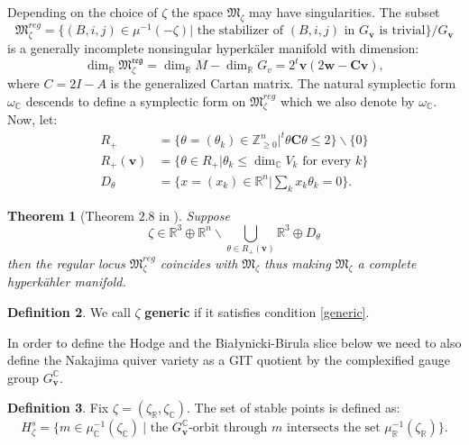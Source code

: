 \documentclass[12pt,oneside,reqno]{amsart}
\newtheorem{theorem}{Theorem}
\theoremstyle{definition}
\newtheorem{definition}[theorem]{Definition}
\numberwithin{equation}{section}
\numberwithin{theorem}{section}
\newcommand{\Z}{\mathbb{Z}}
\newcommand{\R}{\mathbb{R}}
\newcommand{\C}{\mathbb{C}}
\renewcommand{\dim}{\operatorname{dim}}
\begin{document}
Depending on the choice of $\zeta$ the space $\mathfrak{M}_{\zeta}$ may have singularities. The subset
%
\begin{equation}
\mathfrak{M}_{\zeta}^{reg}=\{(B,i,j) \in \mu^{-1}(-\zeta)|\text{ the stabilizer of }(B,i,j) \text{ in } G_{\mathbf{v}} \text{ is trivial}\}/G_{\mathbf{v}}
\end{equation}
%
is a generally incomplete nonsingular hyperk\"aler manifold with dimension: 
\begin{equation*}
\dim_\R \mathfrak{M_\zeta ^{reg}}=\dim_\R M-\dim_\R G_v=2^t \mathbf{v}(2\mathbf{w}-\mathbf{Cv}), 
\end{equation*}
%
where $C=2I-A$ is the generalized Cartan matrix. The natural symplectic form $\omega_{\C}$ descends to define a symplectic form on $\mathfrak{M}_\zeta ^{reg}$ which we also denote by $\omega_\C$. Now, let: 
%
\begin{equation*}
    \begin{split}
        R_+ &=\{\theta =(\theta_k) \in \Z_{\ge 0}^n | ^t \theta\mathbf{C}\theta \le2\}\backslash \{0\} \\
        R_+(\mathbf{v})&= \{\theta \in R_+|\theta _k \le \dim_\C V_k \text{ for every } k\} \\
        D_{\theta}&=\{x=(x_k) \in \R^n|\sum \limits_k x_k \theta _k =0\}.
    \end{split}
\end{equation*}
%
%
\begin{theorem}[Theorem $2.8$ in \cite{Na1994}]\label{generic}
    Suppose 
    \begin{equation}\label{generic}
        \zeta \in \R^3\oplus\R^n \backslash\bigcup \limits_ {\theta \in R_+(\mathbf{v})}\R^3\oplus D_\theta
    \end{equation}  
    then the regular locus $\mathfrak{M}_\zeta ^{reg}$ coincides with $\mathfrak{M}_\zeta$ thus making $\mathfrak{M}_{\zeta}$ a complete hyperk\"ahler manifold.
\end{theorem}
%
%
\begin{definition}
    We call $\zeta$ \textbf{generic} if it satisfies condition \eqref{generic}.
\end{definition}
%
In order to define the Hodge and the Bia\l{}ynicki-Birula slice below we need to also define the Nakajima quiver variety as a GIT quotient by the complexified gauge group $G_{\mathbf{v}}^{\C}$. 
%
\begin{definition}
    Fix $\zeta=(\zeta_\R,\zeta_\C)$. The set of stable points is defined as:
    \begin{equation*}
        H_\zeta ^s=\{m \in \mu_\C^{-1}(\zeta_\C)~|\text{ the } G_{\mathbf{v}}^\C \text {-orbit through } m \text{ intersects the  set } \mu_\R^{-1}(\zeta_\R)\}.
    \end{equation*}
\end{definition}
%
\end{document}
